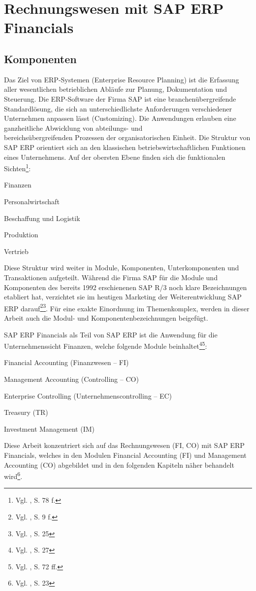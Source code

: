 \section{Rechnungswesen mit SAP ERP Financials}
\subsection{Komponenten}
\label{sec:Komponenten}
Das Ziel von ERP-Systemen (Enterprise Resource Planning) ist die Erfassung aller wesentlichen betrieblichen Abläufe zur Planung, Dokumentation und Steuerung. Die ERP-Software der Firma SAP ist eine branchenübergreifende Standardlösung, die sich an unterschiedlichste Anforderungen verschiedener Unternehmen anpassen lässt (Customizing). Die Anwendungen erlauben eine ganzheitliche Abwicklung von abteilungs- und\\bereichsübergreifenden Prozessen der organisatorischen Einheit. Die Struktur von SAP ERP orientiert sich an den klassischen betriebswirtschaftlichen Funktionen eines Unternehmens. Auf der obersten Ebene finden sich die funktionalen Sichten\footnote{Vgl. \cite{Bauer2009}, S. 78 f.}:
\begin{compactitem}
\item Finanzen
\item Personalwirtschaft
\item Beschaffung und Logistik
\item Produktion
\item Vertrieb
\end{compactitem}
Diese Struktur wird weiter in Module, Komponenten, Unterkomponenten und Transaktionen aufgeteilt. Während die Firma SAP für die Module und Komponenten des bereits 1992 erschienenen SAP R/3 noch klare Bezeichnungen etabliert hat, verzichtet sie im heutigen Marketing der Weiterentwicklung SAP ERP darauf\footnote{Vgl. \cite{Klein2010}, S. 9 f.}\footnote{Vgl. \cite{Hefner2001}, S. 25}. Für eine exakte Einordnung im Themenkomplex, werden in dieser Arbeit auch die Modul- und Komponentenbezeichnungen beigefügt.

SAP ERP Financials als Teil von SAP ERP ist die Anwendung für die Unternehmenssicht Finanzen, welche folgende Module beinhaltet\footnote{Vgl. \cite{Hefner2001}, S. 27}\footnote{Vgl. \cite{Muir2009}, S. 72 ff.}:
\begin{compactitem}
\item Financial Accounting (Finanzwesen -- FI)
\item Management Accounting (Controlling -- CO)
\item Enterprise Controlling (Unternehmenscontrolling -- EC)
\item Treasury (TR)
\item Investment Management (IM)
\end{compactitem}
Diese Arbeit konzentriert sich auf das Rechnungswesen (FI, CO) mit SAP ERP Financials, welches in den Modulen Financial Accounting (FI) und Management Accounting (CO) abgebildet und in den folgenden Kapiteln näher behandelt wird\footnote{Vgl. \cite{Patel2009}, S. 23}.

